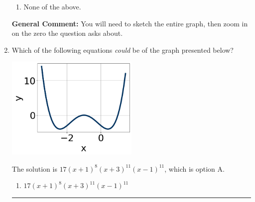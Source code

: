 \documentclass{extbook}[14pt]
\newcommand{\litem}[1]{\item #1

\rule{\textwidth}{0.4pt}}
\begin{document}
\begin{enumerate}
{\begin{enumerate}[label=\Alph*.]
\item None of the above.\end{enumerate}
\textbf{General Comment:} You will need to sketch the entire graph, then zoom in on the zero the question asks about.
}
\litem{
Which of the following equations \textit{could} be of the graph presented below?

\begin{center}
    \includegraphics[width=0.5\textwidth]{../Figures/polyGraphToFunctionB.png}
\end{center}




The solution is \( 17(x + 1)^{8} (x + 3)^{11} (x - 1)^{11} \), which is option A.\begin{enumerate}[label=\Alph*.]
\item \( 17(x + 1)^{8} (x + 3)^{11} (x - 1)^{11} \)


\end{enumerate}}
\end{enumerate}
\end{document}
